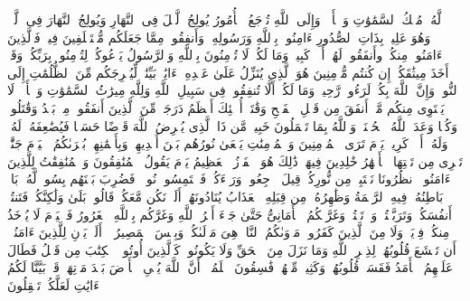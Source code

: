 لَّهُۥ مُلۡكُ ٱلسَّمَٰوَٰتِ وَٱلۡأَرۡضِۚ وَإِلَى ٱللَّهِ تُرۡجَعُ ٱلۡأُمُورُ%
\stopbuffer
\startbuffer[\q:57:6]
یُولِجُ ٱلَّیۡلَ فِی ٱلنَّهَارِ وَیُولِجُ ٱلنَّهَارَ فِی ٱلَّیۡلِۚ وَهُوَ عَلِیمُۢ بِذَاتِ ٱلصُّدُورِ%
\stopbuffer
\startbuffer[\q:57:7]
ءَامِنُوا۟ بِٱللَّهِ وَرَسُولِهِۦ وَأَنفِقُوا۟ مِمَّا جَعَلَكُم مُّسۡتَخۡلَفِینَ فِیهِۖ فَٱلَّذِینَ ءَامَنُوا۟ مِنكُمۡ وأَنفَقُوا۟ لَهُمۡ أَجۡرࣱ كَبِیرࣱ%
\stopbuffer
\startbuffer[\q:57:8]
وَمَا لَكُمۡ لَا تُؤۡمِنُونَ بِٱللَّهِ وَٱلرَّسُولُ یَدۡعُوكُمۡ لِتُؤۡمِنُوا۟ بِرَبِّكُمۡ وَقَدۡ أَخَذَ مِیثَٰقَكُمۡ إِن كُنتُم مُّؤۡمِنِینَ%
\stopbuffer
\startbuffer[\q:57:9]
هُوَ ٱلَّذِی یُنَزِّلُ عَلَىٰ عَبۡدِهِۦۤ ءَایَٰتِۭ بَیِّنَٰتࣲ لِّیُخۡرِجَكُم مِّنَ ٱلظُّلُمَٰتِ إِلَى ٱلنُّورِۚ وَإِنَّ ٱللَّهَ بِكُمۡ لَرَءُوفࣱ رَّحِیمࣱ%
\stopbuffer
\startbuffer[\q:57:10]
وَمَا لَكُمۡ أَلَّا تُنفِقُوا۟ فِی سَبِیلِ ٱللَّهِ وَلِلَّهِ مِیرَٰثُ ٱلسَّمَٰوَٰتِ وَٱلۡأَرۡضِۚ لَا یَسۡتَوِی مِنكُم مَّنۡ أَنفَقَ مِن قَبۡلِ ٱلۡفَتۡحِ وَقَٰتَلَۚ أُو۟لَٰۤئِكَ أَعۡظَمُ دَرَجَةࣰ مِّنَ ٱلَّذِینَ أَنفَقُوا۟ مِنۢ بَعۡدُ وَقَٰتَلُوا۟ۚ وَكُلࣰّا وَعَدَ ٱللَّهُ ٱلۡحُسۡنَىٰۚ وَٱللَّهُ بِمَا تَعۡمَلُونَ خَبِیرࣱ%
\stopbuffer
\startbuffer[\q:57:11]
مَّن ذَا ٱلَّذِی یُقۡرِضُ ٱللَّهَ قَرۡضًا حَسَنࣰا فَیُضَٰعِفَهُۥ لَهُۥ وَلَهُۥۤ أَجۡرࣱ كَرِیمࣱ%
\stopbuffer
\startbuffer[\q:57:12]
یَوۡمَ تَرَى ٱلۡمُؤۡمِنِینَ وَٱلۡمُؤۡمِنَٰتِ یَسۡعَىٰ نُورُهُم بَیۡنَ أَیۡدِیهِمۡ وَبِأَیۡمَٰنِهِمۖ بُشۡرَىٰكُمُ ٱلۡیَوۡمَ جَنَّٰتࣱ تَجۡرِی مِن تَحۡتِهَا ٱلۡأَنۡهَٰرُ خَٰلِدِینَ فِیهَاۚ ذَٰلِكَ هُوَ ٱلۡفَوۡزُ ٱلۡعَظِیمُ%
\stopbuffer
\startbuffer[\q:57:13]
یَوۡمَ یَقُولُ ٱلۡمُنَٰفِقُونَ وَٱلۡمُنَٰفِقَٰتُ لِلَّذِینَ ءَامَنُوا۟ ٱنظُرُونَا نَقۡتَبِسۡ مِن نُّورِكُمۡ قِیلَ ٱرۡجِعُوا۟ وَرَاۤءَكُمۡ فَٱلۡتَمِسُوا۟ نُورࣰاۖ فَضُرِبَ بَیۡنَهُم بِسُورࣲ لَّهُۥ بَابُۢ بَاطِنُهُۥ فِیهِ ٱلرَّحۡمَةُ وَظَٰهِرُهُۥ مِن قِبَلِهِ ٱلۡعَذَابُ%
\stopbuffer
\startbuffer[\q:57:14]
یُنَادُونَهُمۡ أَلَمۡ نَكُن مَّعَكُمۡۖ قَالُوا۟ بَلَىٰ وَلَٰكِنَّكُمۡ فَتَنتُمۡ أَنفُسَكُمۡ وَتَرَبَّصۡتُمۡ وَٱرۡتَبۡتُمۡ وَغَرَّتۡكُمُ ٱلۡأَمَانِیُّ حَتَّىٰ جَاۤءَ أَمۡرُ ٱللَّهِ وَغَرَّكُم بِٱللَّهِ ٱلۡغَرُورُ%
\stopbuffer
\startbuffer[\q:57:15]
فَٱلۡیَوۡمَ لَا یُؤۡخَذُ مِنكُمۡ فِدۡیَةࣱ وَلَا مِنَ ٱلَّذِینَ كَفَرُوا۟ۚ مَأۡوَىٰكُمُ ٱلنَّارُۖ هِیَ مَوۡلَىٰكُمۡۖ وَبِئۡسَ ٱلۡمَصِیرُ%
\stopbuffer
\startbuffer[\q:57:16]
۞ أَلَمۡ یَأۡنِ لِلَّذِینَ ءَامَنُوۤا۟ أَن تَخۡشَعَ قُلُوبُهُمۡ لِذِكۡرِ ٱللَّهِ وَمَا نَزَلَ مِنَ ٱلۡحَقِّ وَلَا یَكُونُوا۟ كَٱلَّذِینَ أُوتُوا۟ ٱلۡكِتَٰبَ مِن قَبۡلُ فَطَالَ عَلَیۡهِمُ ٱلۡأَمَدُ فَقَسَتۡ قُلُوبُهُمۡۖ وَكَثِیرࣱ مِّنۡهُمۡ فَٰسِقُونَ%
\stopbuffer
\startbuffer[\q:57:17]
ٱعۡلَمُوۤا۟ أَنَّ ٱللَّهَ یُحۡیِ ٱلۡأَرۡضَ بَعۡدَ مَوۡتِهَاۚ قَدۡ بَیَّنَّا لَكُمُ ٱلۡءَایَٰتِ لَعَلَّكُمۡ تَعۡقِلُونَ%
